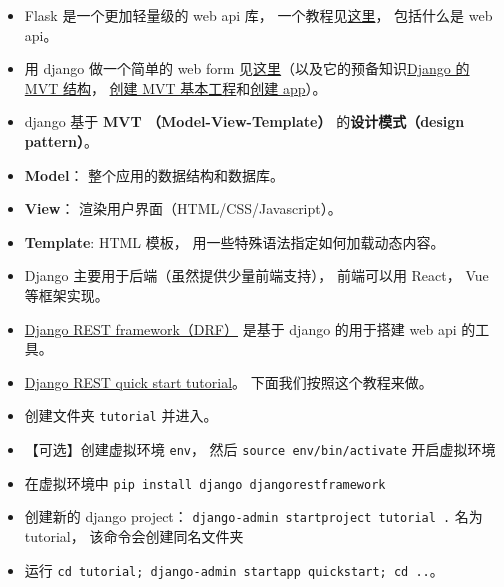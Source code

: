 

\begin{issues}
\issueDraft
\end{issues}

\begin{itemize}
\item Flask 是一个更加轻量级的 web api 库， 一个教程见\href{https://programminghistorian.org/en/lessons/creating-apis-with-python-and-flask}{这里}， 包括什么是 web api。
\item 用 django 做一个简单的 web form 见\href{https://www.geeksforgeeks.org/how-to-create-a-form-using-django-forms/}{这里}（以及它的预备知识\href{https://www.geeksforgeeks.org/django-project-mvt-structure}{Django 的 MVT 结构}， \href{https://www.geeksforgeeks.org/how-to-create-a-basic-project-using-mvt-in-django/}{创建 MVT 基本工程}和\href{https://www.geeksforgeeks.org/how-to-create-an-app-in-django/}{创建 app}）。
\item django 基于 \textbf{MVT （Model-View-Template）} 的\textbf{设计模式（design pattern）}。
\item \textbf{Model}： 整个应用的数据结构和数据库。
\item \textbf{View}： 渲染用户界面（HTML/CSS/Javascript）。
\item \textbf{Template}: HTML 模板， 用一些特殊语法指定如何加载动态内容。
\item Django 主要用于后端（虽然提供少量前端支持）， 前端可以用 React， Vue 等框架实现。
\item \href{https://www.django-rest-framework.org/}{Django REST framework（DRF）} 是基于 django 的用于搭建 web api 的工具。
\item \href{https://www.django-rest-framework.org/tutorial/quickstart/}{Django REST quick start tutorial}。 下面我们按照这个教程来做。
\item 创建文件夹 \verb|tutorial| 并进入。
\item 【可选】创建虚拟环境 \verb|env|， 然后 \verb|source env/bin/activate| 开启虚拟环境
\item 在虚拟环境中 \verb|pip install django djangorestframework|
\item 创建新的 django project： \verb|django-admin startproject tutorial .| 名为 tutorial， 该命令会创建同名文件夹
\item 运行 \verb|cd tutorial; django-admin startapp quickstart; cd ..|。
\begin{figure}[ht]

\end{figure}
\end{itemize}
